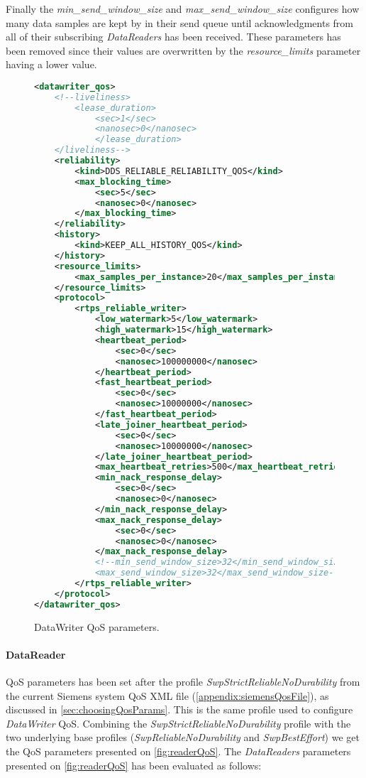 \begin{itemize}
	Finally the \textit{min\_send\_window\_size} and \textit{max\_send\_window\_size} configures how many data samples are kept by in their send queue until acknowledgments from all of their subscribing \textit{DataReaders} has been received. These parameters has been removed since their values are overwritten by the \textit{resource\_limits} parameter having a lower value.
\end{itemize}

\begin{figure}
\begin{lstlisting}[language=XML]
<datawriter_qos>
	<!--liveliness>
		<lease_duration>
			<sec>1</sec>
			<nanosec>0</nanosec>
			</lease_duration>
	</liveliness-->
	<reliability>
		<kind>DDS_RELIABLE_RELIABILITY_QOS</kind>
		<max_blocking_time>
			<sec>5</sec>
			<nanosec>0</nanosec>
		</max_blocking_time>
	</reliability>
	<history>
		<kind>KEEP_ALL_HISTORY_QOS</kind>
	</history>
	<resource_limits>
		<max_samples_per_instance>20</max_samples_per_instance>
	</resource_limits>
	<protocol>
		<rtps_reliable_writer>
			<low_watermark>5</low_watermark>
			<high_watermark>15</high_watermark>
			<heartbeat_period>
				<sec>0</sec>
				<nanosec>100000000</nanosec>
			</heartbeat_period>
			<fast_heartbeat_period>
				<sec>0</sec>
				<nanosec>10000000</nanosec>
			</fast_heartbeat_period>
			<late_joiner_heartbeat_period>
				<sec>0</sec>
				<nanosec>10000000</nanosec>
			</late_joiner_heartbeat_period>
			<max_heartbeat_retries>500</max_heartbeat_retries>
			<min_nack_response_delay>
				<sec>0</sec>
				<nanosec>0</nanosec>
			</min_nack_response_delay>
			<max_nack_response_delay>
				<sec>0</sec>
				<nanosec>0</nanosec>
			</max_nack_response_delay>
			<!--min_send_window_size>32</min_send_window_size>
			<max_send_window_size>32</max_send_window_size-->
		</rtps_reliable_writer>
	</protocol>
</datawriter_qos>
\end{lstlisting}
\caption[DataWriter QoS parameters]{
		\label{fig:writerQoS} 
		\footnotesize{DataWriter QoS parameters.}
	}
\end{figure}

\paragraph{DataReader} QoS parameters has been set after the profile \textit{SwpStrictReliableNoDurability} from the current Siemens system QoS XML file (\cref{appendix:siemensQosFile}), as discussed in \cref{sec:choosingQosParams}. This is the same profile used to configure \textit{DataWriter} QoS. Combining the \textit{SwpStrictReliableNoDurability} profile with the two underlying base profiles (\textit{SwpReliableNoDurability} and \textit{SwpBestEffort}) we get the QoS parameters presented on \cref{fig:readerQoS}. The \textit{DataReaders} parameters presented on \cref{fig:readerQoS} has been evaluated as follows:

